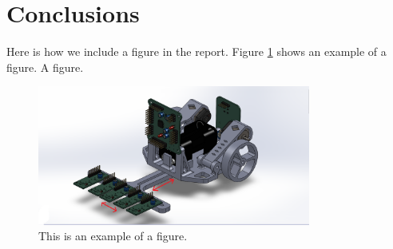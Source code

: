 \documentclass[12pt]{article}
\begin{document}
\newpage

\section{Conclusions}


\newpage


\printbibliography

\newpage
\appendix

Here is how we include a figure in the report. Figure \ref{fig:example} shows an example of a figure. A figure.

\begin{figure}[H]
  \centering
  \includegraphics[width=0.8\textwidth]{example.png}
  \caption{This is an example of a figure.}
  \label{fig:example}
\end{figure}
\end{document}
